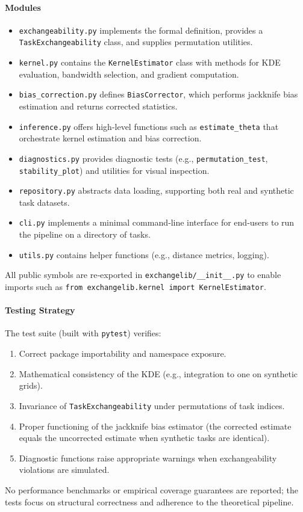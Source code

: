 \documentclass[11pt,a4paper]{article}
\begin{document}
\paragraph{Modules}
\begin{itemize}
\item \texttt{exchangeability.py} implements the formal definition, provides a \texttt{TaskExchangeability} class, and supplies permutation utilities.
\item \texttt{kernel.py} contains the \texttt{KernelEstimator} class with methods for KDE evaluation, bandwidth selection, and gradient computation.
\item \texttt{bias_correction.py} defines \texttt{BiasCorrector}, which performs jackknife bias estimation and returns corrected statistics.
\item \texttt{inference.py} offers high‑level functions such as \texttt{estimate\_theta} that orchestrate kernel estimation and bias correction.
\item \texttt{diagnostics.py} provides diagnostic tests (e.g., \texttt{permutation\_test}, \texttt{stability\_plot}) and utilities for visual inspection.
\item \texttt{repository.py} abstracts data loading, supporting both real and synthetic task datasets.
\item \texttt{cli.py} implements a minimal command‑line interface for end‑users to run the pipeline on a directory of tasks.
\item \texttt{utils.py} contains helper functions (e.g., distance metrics, logging).
\end{itemize}

All public symbols are re‑exported in \texttt{exchangelib/__init__.py} to enable imports such as
\texttt{from exchangelib.kernel import KernelEstimator}.

\paragraph{Testing Strategy}
The test suite (built with \texttt{pytest}) verifies:
\begin{enumerate}
\item Correct package importability and namespace exposure.
\item Mathematical consistency of the KDE (e.g., integration to one on synthetic grids).
\item Invariance of \texttt{TaskExchangeability} under permutations of task indices.
\item Proper functioning of the jackknife bias estimator (the corrected estimate equals the uncorrected estimate when synthetic tasks are identical).
\item Diagnostic functions raise appropriate warnings when exchangeability violations are simulated.
\end{enumerate}
No performance benchmarks or empirical coverage guarantees are reported; the tests focus on structural correctness and adherence to the theoretical pipeline.
\end{document}
